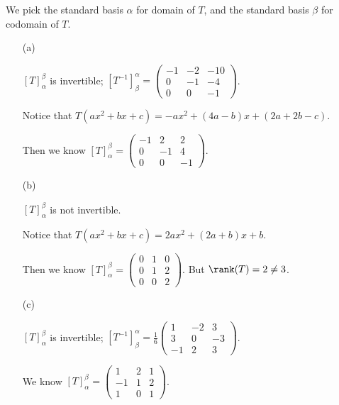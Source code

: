 \begin{Exercise}
	We pick the standard basis $\alpha$ for domain of $T$, and the standard basis $\beta$ for codomain of $T$.
	\begin{enumerate}[(a)]
		\item[(a)]
		\begin{answer}
			$[T]_{\alpha}^{\beta}$ is invertible; $[T^{-1}]_{\beta}^{\alpha} = \begin{pmatrix}
			-1 & -2 & -10 \\
			0 & -1 & -4 \\
			0 & 0 & -1
			\end{pmatrix}$.
		\end{answer}
		\begin{solution}
			Notice that $T(a x^2 +b x+c) = -a x^2 + (4a-b)x+(2a+2b-c)$. 
			
			Then we know $[T]_{\alpha}^{\beta}=\begin{pmatrix}
			-1 & 2 & 2 \\
			0 & -1 & 4 \\
			0 & 0 & -1
			\end{pmatrix}$.
		\end{solution}
		
		\item[(b)]
		\begin{answer}
			$[T]_{\alpha}^{\beta}$ is not invertible.
		\end{answer}
		\begin{solution}
			Notice that $T(a x^2 +b x+c) = 2a x^2 + (2a+b)x+b$. 
			
			Then we know $[T]_{\alpha}^{\beta}=\begin{pmatrix}
			0 & 1 & 0 \\
			0 & 1 & 2 \\
			0 & 0 & 2
			\end{pmatrix}$. But $\rank(T) = 2 \neq 3$.
		\end{solution}
		
		\item[(c)]
		\begin{answer}
			$[T]_{\alpha}^{\beta}$ is invertible; $[T^{-1}]_{\beta}^{\alpha} = \frac{1}{6}\begin{pmatrix}
			1 & -2 & 3 \\
			3 & 0 & -3 \\
			-1 & 2 & 3
			\end{pmatrix}$.
		\end{answer}
		\begin{solution}
			We know $[T]_{\alpha}^{\beta}=\begin{pmatrix}
			1 & 2 & 1 \\
			-1 & 1 & 2 \\
			1 & 0 & 1
			\end{pmatrix}$.
		\end{solution}
	\end{enumerate}
\end{Exercise}